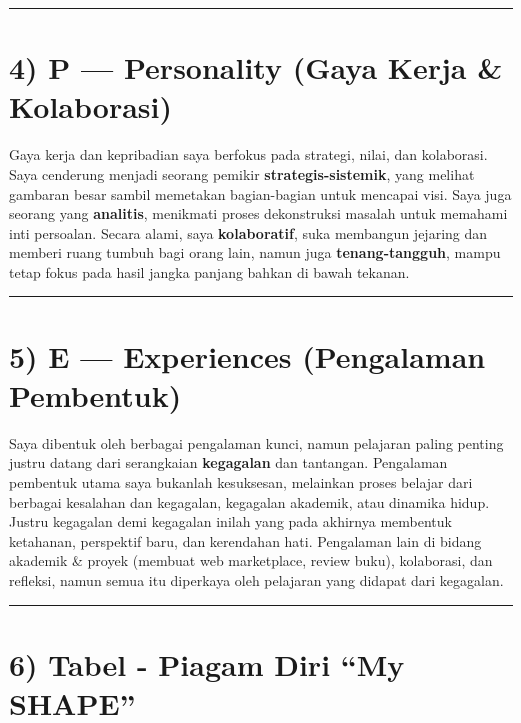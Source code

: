 \documentclass[
  letterpaper,
  DIV=11,
  numbers=noendperiod]{scrreprt}
\begin{document}
\begin{center}\rule{0.5\linewidth}{0.5pt}\end{center}

\section{4) P --- Personality (Gaya Kerja \&
Kolaborasi)}\label{p-personality-gaya-kerja-kolaborasi}

Gaya kerja dan kepribadian saya berfokus pada strategi, nilai, dan
kolaborasi. Saya cenderung menjadi seorang pemikir
\textbf{strategis-sistemik}, yang melihat gambaran besar sambil
memetakan bagian-bagian untuk mencapai visi. Saya juga seorang yang
\textbf{analitis}, menikmati proses dekonstruksi masalah untuk memahami
inti persoalan. Secara alami, saya \textbf{kolaboratif}, suka membangun
jejaring dan memberi ruang tumbuh bagi orang lain, namun juga
\textbf{tenang-tangguh}, mampu tetap fokus pada hasil jangka panjang
bahkan di bawah tekanan.

\begin{center}\rule{0.5\linewidth}{0.5pt}\end{center}

\section{5) E --- Experiences (Pengalaman
Pembentuk)}\label{e-experiences-pengalaman-pembentuk}

Saya dibentuk oleh berbagai pengalaman kunci, namun pelajaran paling
penting justru datang dari serangkaian \textbf{kegagalan} dan tantangan.
Pengalaman pembentuk utama saya bukanlah kesuksesan, melainkan proses
belajar dari berbagai kesalahan dan kegagalan, kegagalan akademik, atau
dinamika hidup. Justru kegagalan demi kegagalan inilah yang pada
akhirnya membentuk ketahanan, perspektif baru, dan kerendahan hati.
Pengalaman lain di bidang akademik \& proyek (membuat web marketplace,
review buku), kolaborasi, dan refleksi, namun semua itu diperkaya oleh
pelajaran yang didapat dari kegagalan.

\begin{center}\rule{0.5\linewidth}{0.5pt}\end{center}

\section{6) Tabel - Piagam Diri ``My
SHAPE''}\label{tabel---piagam-diri-my-shape}
\end{document}
